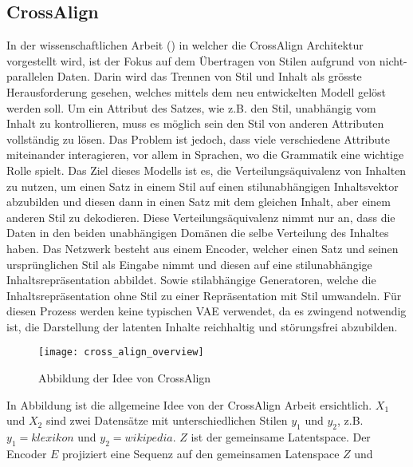 \subsection{CrossAlign}
\label{sub:cross_align}
In der wissenschaftlichen Arbeit (\cite{shen2017style}) in welcher die CrossAlign Architektur vorgestellt wird, ist der
Fokus auf dem Übertragen von Stilen aufgrund von nicht-parallelen Daten. Darin wird das Trennen von Stil und Inhalt als
grösste Herausforderung gesehen, welches mittels dem neu entwickelten Modell gelöst werden soll.
\newline
\newline
Um ein Attribut des Satzes, wie z.B. den Stil, unabhängig vom Inhalt zu kontrollieren, muss es möglich sein den Stil von
anderen Attributen vollständig zu lösen. Das Problem ist jedoch, dass viele verschiedene Attribute miteinander
interagieren, vor allem in Sprachen, wo die Grammatik eine wichtige Rolle spielt.
\newline
\newline
Das Ziel dieses Modells ist es, die Verteilungsäquivalenz von Inhalten zu nutzen, um einen Satz in einem Stil auf einen
stilunabhängigen Inhaltsvektor abzubilden und diesen dann in einen Satz mit dem gleichen Inhalt, aber einem anderen Stil
zu dekodieren. Diese Verteilungsäquivalenz nimmt nur an, dass die Daten in den beiden unabhängigen Domänen die selbe
Verteilung des Inhaltes haben.
\newline
\newline
Das Netzwerk besteht aus einem Encoder, welcher einen Satz und seinen ursprünglichen Stil als Eingabe nimmt und diesen
auf eine stilunabhängige Inhaltsrepräsentation abbildet. Sowie stilabhängige Generatoren, welche die
Inhaltsrepräsentation ohne Stil zu einer Repräsentation mit Stil umwandeln. Für diesen Prozess werden keine typischen
\gls{VAE} verwendet, da es zwingend notwendig ist, die Darstellung der latenten Inhalte reichhaltig und störungsfrei
abzubilden.
\begin{figure}[H]
	\centering
	\texttt{[image: cross\_align\_overview]}
	\caption{Abbildung der Idee von CrossAlign}
	\label{fig:cross_align_overview}
\end{figure}
\noindent
In Abbildung  ist die allgemeine Idee von der CrossAlign Arbeit ersichtlich. $X_1$ und
$X_2$ sind zwei Datensätze mit unterschiedlichen Stilen $y_1$ und $y_2$, z.B. $y_1 = klexikon$ und $y_2 = wikipedia$.
$Z$ ist der gemeinsame Latentspace. Der Encoder $E$ projiziert eine Sequenz auf den gemeinsamen Latenspace $Z$ und
